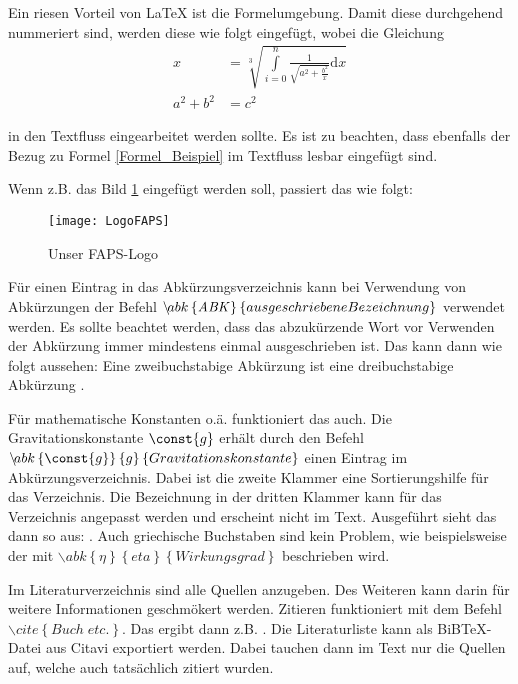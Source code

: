 Ein riesen Vorteil von \LaTeX\; ist die Formelumgebung. Damit diese durchgehend
nummeriert sind, werden diese wie folgt eingefügt, wobei die Gleichung
\begin{align}
	\label{Formel_Beispiel}
	x&=\sqrt[3]{\int \limits_{i=0}^{n} \frac{1}{\sqrt{a^2 + \frac{b^2}{x}}} \mbox{d}x}\\
	a^2+b^2 &= c^2
\end{align}

in den Textfluss eingearbeitet werden sollte. Es ist zu beachten, dass ebenfalls der Bezug zu Formel
\eqref{Formel_Beispiel} im Textfluss lesbar eingefügt sind.

Wenn z.B. das Bild \ref{Bild_Beispiel} eingefügt werden soll, passiert das wie
folgt:
\begin{figure}[ht!]
	\centering
 	\texttt{[image: LogoFAPS]}
	\caption{Unser FAPS-Logo}
	\label{Bild_Beispiel}
\end{figure}

Für einen Eintrag in das Abkürzungsverzeichnis kann bei Verwendung von
Abkürzungen der Befehl $\backslash\!abk\left\{\text{\emph{ABK}}\right\}\left\{ausgeschriebene Bezeichnung\right\}$ verwendet werden. Es sollte
beachtet werden, dass das abzukürzende Wort vor Verwenden der Abkürzung immer
mindestens einmal ausgeschrieben ist.
Das kann dann wie folgt aussehen: Eine zweibuchstabige Abkürzung  ist eine dreibuchstabige Abkürzung .

Für mathematische Konstanten o.ä. funktioniert das auch. Die Gravitationskonstante $\const{g}$ erhält durch
den Befehl $\backslash\!abk\left\{\const{g}\right\}\left\{g\right\}\left\{Gravitationskonstante\right\}$ einen Eintrag im Abkürzungsverzeichnis. Dabei ist die zweite Klammer eine Sortierungshilfe für das Verzeichnis. Die Bezeichnung in der dritten Klammer kann für das Verzeichnis angepasst werden und erscheint nicht im Text. Ausgeführt sieht das dann so aus: . Auch griechische Buchstaben sind kein Problem, wie beispielsweise der  mit $\backslash\!abk\left\{\eta\right\}\left\{eta\right\}\left\{Wirkungsgrad\right\}$ beschrieben wird.

Im Literaturverzeichnis sind alle Quellen anzugeben. Des Weiteren kann darin für weitere Informationen geschmökert werden.
Zitieren funktioniert mit dem Befehl $\backslash\!cite\left\{ Buch\;etc.\right\}$. Das ergibt dann z.B. \cite{Resetarics.2009}. Die Literaturliste kann als BiBTeX-Datei aus Citavi exportiert werden. Dabei tauchen dann im Text nur die Quellen auf, welche auch tatsächlich zitiert wurden.

